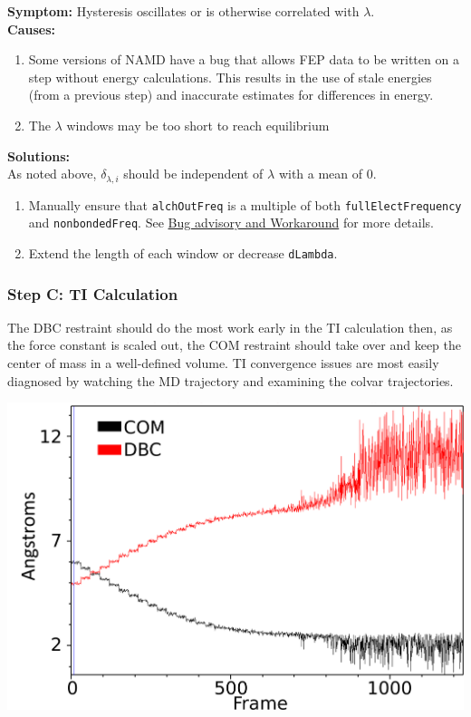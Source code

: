 \documentclass[9pt,tutorial,pubversion]{Styling/livecoms}
\newcommand{\textInput}[1]{\texttt{#1}}
\begin{document}
\noindent\textbf{Symptom:}  Hysteresis oscillates or is otherwise correlated with $\lambda$.\\
\textbf{Causes:}
\begin{enumerate}
    \item Some versions of NAMD have a bug that allows FEP data to be written on a step without energy calculations. This results in the use of stale energies (from a previous step) and inaccurate estimates for differences in energy.
    \item The $\lambda$ windows may be too short to reach equilibrium
\end{enumerate}

\noindent\textbf{Solutions:}\\
As noted above, $\delta_{\lambda,i}$ should be independent of $\lambda$ with a mean of 0.
\begin{enumerate}
    \item Manually ensure that \textInput{alchOutFreq} is a multiple of both \textInput{fullElectFrequency} and \textInput{nonbondedFreq}. See \href{https://www.ks.uiuc.edu/Research/namd/mailing_list/namd-l.2020-2021/1487.html}{Bug advisory and Workaround} for more details.
    \item Extend the length of each window or decrease \textInput{dLambda}.
\end{enumerate}

\subsubsection{Step C: TI Calculation}
The DBC restraint should do the most work early in the TI calculation then, as the force constant is scaled out, the COM restraint should take over and keep the center of mass in a well-defined volume. TI convergence issues are most easily diagnosed by watching the MD trajectory and examining the colvar trajectories.

\includegraphics[width=0.9\linewidth]{CV_COM_mismatchedRefs.png}
\end{document}
